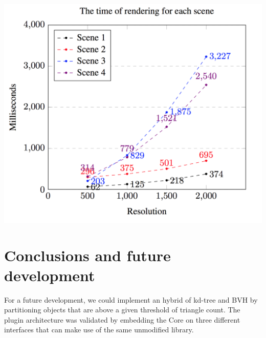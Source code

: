 \documentclass[a0,portrait]{a0poster}
\begin{document}
\begin{multicols}{2}
\begin{center}\vspace{1cm}
\includegraphics[width=0.8\linewidth]{results_rendered}
\end{center}\vspace{1cm}



\section*{Conclusions and future development}

For a future development, we could implement an hybrid of kd-tree and
BVH by partitioning objects that are above a given threshold of
triangle count. The plugin architecture was validated by embedding the
Core on three different interfaces that can make use of the same
unmodified library.



\end{multicols}
\end{document}
